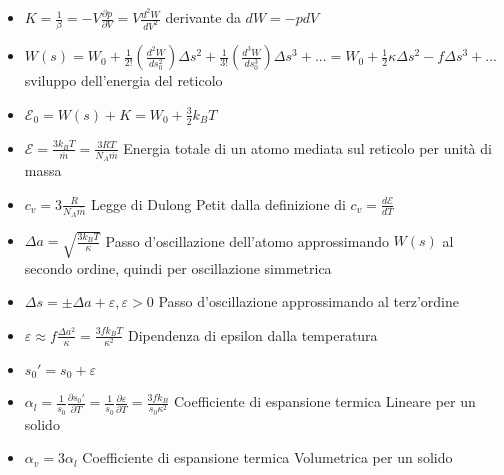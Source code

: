 \documentclass[a4paper]{article}
\begin{document}
\begin{itemize}
	\item $K=\frac{1}{\beta}=-V \frac{\partial p}{\partial V} = V\frac{d^2W}{dV^2}$ derivante da $dW=-pdV$
	\item $W(s)=W_0+\frac{1}{2!}(\frac{d^2W}{ds_0^2})\Delta s^2+\frac{1}{3!}(\frac{d^3W}{ds_0^3}) \Delta s^3+...=W_0+\frac{1}{2}\kappa\Delta s^2-f \Delta s^3+...$ sviluppo dell'energia del reticolo
	\item $\mathcal{E}_0 =W(s)+ K =W_0+\frac{3}{2}k_BT$ 
	\item $\mathcal{E} = \frac{3k_BT}{\overline{m}} = \frac{3RT}{N_A \overline{m}}$ Energia totale di un atomo mediata sul reticolo per unità di massa
	\item $c_v = 3 \frac{R}{N_A \overline{m}}$ Legge di Dulong Petit dalla definizione di $c_v=\frac{d \mathcal{E}}{dT}$
	\item $\Delta a = \sqrt{\frac{3k_BT}{\kappa}}$ Passo d'oscillazione dell'atomo approssimando $W(s)$ al secondo ordine, quindi per oscillazione simmetrica
	\item $\Delta s = \pm \Delta a + \varepsilon, \varepsilon > 0$ Passo d'oscillazione approssimando al terz'ordine
	\item $\varepsilon \approx f \frac{\Delta a^2}{\kappa} = \frac{3fk_BT}{\kappa^2}$ Dipendenza di epsilon dalla temperatura
	\item $s_0'= s_0 + \varepsilon$
	\item $\alpha_l = \frac{1}{s_0} \frac{\partial s_0'}{\partial T}  = \frac{1}{s_0} \frac{\partial \varepsilon}{\partial T} = \frac{3fk_B}{s_0\kappa^2}$ Coefficiente di espansione termica Lineare per un solido
	\item $\alpha_v = 3\alpha_l$ Coefficiente di espansione termica Volumetrica per un solido
\end{itemize}
\end{document}
